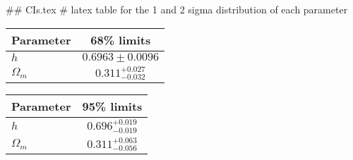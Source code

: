 ## CIs.tex
# latex table for the 1 and 2 sigma distribution of each parameter

\begin{tabular} { l  c}
 Parameter &  68\% limits\\
\hline
{\boldmath$h              $} & $0.6963\pm 0.0096          $\\
{\boldmath$\Omega_m       $} & $0.311^{+0.027}_{-0.032}   $\\
\hline
\end{tabular}

\begin{tabular} { l  c}
 Parameter &  95\% limits\\
\hline
{\boldmath$h              $} & $0.696^{+0.019}_{-0.019}   $\\
{\boldmath$\Omega_m       $} & $0.311^{+0.063}_{-0.056}   $\\
\hline
\end{tabular}
